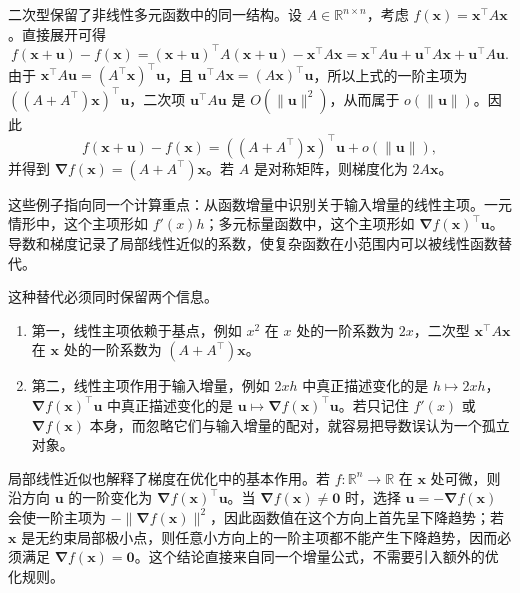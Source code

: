 二次型保留了非线性多元函数中的同一结构。设 \(A\in\mathbb{R}^{n\times n}\)，考虑 \(f(\bm{x})=\bm{x}^\top A\bm{x}\)。直接展开可得
\[
f(\bm{x}+\bm{u})-f(\bm{x})=(\bm{x}+\bm{u})^\top A(\bm{x}+\bm{u})-\bm{x}^\top A\bm{x}
=\bm{x}^\top A\bm{u}+\bm{u}^\top A\bm{x}+\bm{u}^\top A\bm{u}.
\]
由于 \(\bm{x}^\top A\bm{u}=(A^\top \bm{x})^\top \bm{u}\)，且 \(\bm{u}^\top A\bm{x}=(A\bm{x})^\top \bm{u}\)，所以上式的一阶主项为 \(((A+A^\top)\bm{x})^\top \bm{u}\)，二次项 \(\bm{u}^\top A\bm{u}\) 是 \(O(\|\bm{u}\|^2)\)，从而属于 \(o(\|\bm{u}\|)\)。因此
\[
f(\bm{x}+\bm{u})-f(\bm{x})=((A+A^\top)\bm{x})^\top \bm{u}+o(\|\bm{u}\|),
\]
并得到 \(\bm{\nabla} f(\bm{x})=(A+A^\top)\bm{x}\)。若 \(A\) 是对称矩阵，则梯度化为 \(2A\bm{x}\)。

这些例子指向同一个计算重点：从函数增量中识别关于输入增量的线性主项。一元情形中，这个主项形如 \(f'(x)h\)；多元标量函数中，这个主项形如 \(\bm{\nabla} f(\bm{x})^\top \bm{u}\)。导数和梯度记录了局部线性近似的系数，使复杂函数在小范围内可以被线性函数替代。

这种替代必须同时保留两个信息。

\begin{enumerate}
    \item 第一，线性主项依赖于基点，例如 \(x^2\) 在 \(x\) 处的一阶系数为 \(2x\)，二次型 \(\bm{x}^\top A\bm{x}\) 在 \(\bm{x}\) 处的一阶系数为 \((A+A^\top)\bm{x}\)。
    \item 第二，线性主项作用于输入增量，例如 \(2xh\) 中真正描述变化的是 \(h\mapsto 2xh\)，\(\bm{\nabla} f(\bm{x})^\top \bm{u}\) 中真正描述变化的是 \(\bm{u}\mapsto \bm{\nabla} f(\bm{x})^\top \bm{u}\)。若只记住 \(f'(x)\) 或 \(\bm{\nabla} f(\bm{x})\) 本身，而忽略它们与输入增量的配对，就容易把导数误认为一个孤立对象。
\end{enumerate}

局部线性近似也解释了梯度在优化中的基本作用。若 \(f:\mathbb{R}^n\to\mathbb{R}\) 在 \(\bm{x}\) 处可微，则沿方向 \(\bm{u}\) 的一阶变化为 \(\bm{\nabla} f(\bm{x})^\top \bm{u}\)。当 \(\bm{\nabla} f(\bm{x})\ne \bm{0}\) 时，选择 \(\bm{u}=-\bm{\nabla} f(\bm{x})\) 会使一阶主项为 \(-\|\bm{\nabla} f(\bm{x})\|^2\)，因此函数值在这个方向上首先呈下降趋势；若 \(\bm{x}\) 是无约束局部极小点，则任意小方向上的一阶主项都不能产生下降趋势，因而必须满足 \(\bm{\nabla} f(\bm{x})=\bm{0}\)。这个结论直接来自同一个增量公式，不需要引入额外的优化规则。
